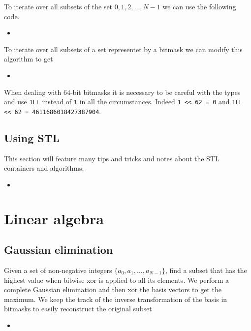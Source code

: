 \documentclass[a4paper, twoside,openany]{book}
\newcommand{\insertcode}[2]{\begin{itemize}\item[]\end{itemize}} %
\begin{document}
To iterate over all subsets of the set ${0, 1, 2, \ldots, N-1}$ we can use the following code.

\insertcode{"codes/list_subsets.cpp"}{A bitmask trick to list all the subsets without recursion.} 

To iterate over all subsets of a set representet by a bitmask we can modify this algorithm to get 

\insertcode{"codes/list_subsets_of_bitmask.cpp"}{A bitmask trick to list all the subsets of a set given by a bitmask without recursion.}

When dealing with 64-bit bitmasks it is necessary to be careful with the types and use {\lstinline[style=Style1]!1LL!} instead of {\lstinline[style=Style1]!1!} in all the circumstances. Indeed {\lstinline[style=Style1]!1 << 62 = 0!} and {\lstinline[style=Style1]!1LL << 62 = 4611686018427387904!}.


\section{Using STL}
This section will feature many tips and tricks and notes about the STL containers and algorithms.

\insertcode{"codes/STL.cpp"}{Introduction to STL}

\chapter{Linear algebra}

\section{Gaussian elimination}
Given a set of non-negative integers $\{ a_0, a_1, \ldots, a_{N-1} \}$, find a subset that has the highest value when bitwise xor is applied to all its elements.
We perform a complete Gaussian elimination and then xor the basis vectors to get the maximum.
We keep the track of the inverse transformation of the basis in bitmasks to easily reconstruct the original subset

\insertcode{"codes/maximal_xor.cpp"}{An algorithm to find a subset of a given set with maximal bitwise xor using Gaussian elimintaion.}


\end{document}
